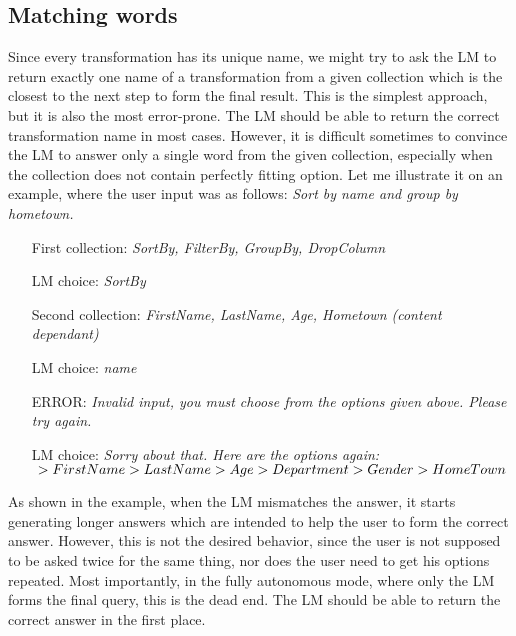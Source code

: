 \documentclass[12pt]{article}
\begin{document}
\subsection{Matching words}

Since every transformation has its unique name, we might try to ask the LM to return exactly one name of a transformation from a given collection which is the closest to the next step to form the final result. This is the simplest approach, but it is also the most error-prone. The LM should be able to return the correct transformation name in most cases. However, it is difficult sometimes to convince the LM to answer only a single word from the given collection, especially when the collection does not contain perfectly fitting option. Let me illustrate it on an example, where the user input was as follows: \textit{Sort by name and group by hometown.}

\begin{enumerate}
    \item[First collection:]\textit{SortBy, FilterBy, GroupBy, DropColumn}
    \item[LM choice:]\textit{SortBy}
    \item[Second collection:]\textit{FirstName, LastName, Age, Hometown (content dependant)} 
    \item[LM choice:]\textit{name}
    \item[ERROR:]\textit{Invalid input, you must choose from the options given above. Please try again.}
    \item[LM choice:]\textit{Sorry about that. Here are the options again: \begin{math}
        \newline
        > First Name
        \newline
        > LastName
        \newline
        > Age
        \newline
        > Department
        \newline
        > Gender
        \newline
        > HomeTown
        \newline
        \end{math}} 
\end{enumerate}

\pagebreak

As shown in the example, when the LM mismatches the answer, it starts generating longer answers which are intended to help the user to form the correct answer. However, this is not the desired behavior, since the user is not supposed to be asked twice for the same thing, nor does the user need to get his options repeated. Most importantly, in the fully autonomous mode, where only the LM forms the final query, this is the dead end. The LM should be able to return the correct answer in the first place.
\end{document}
